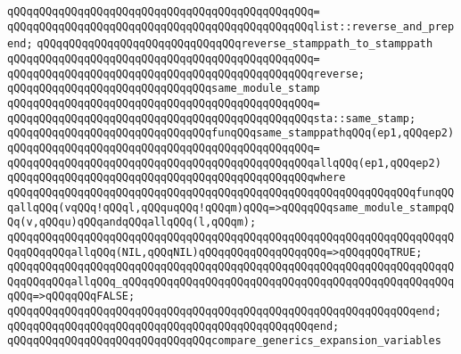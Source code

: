 \verb|qQQqqQQqqQQqqQQqqQQqqQQqqQQqqQQqqQQqqQQqqQQqqQQq=|\newline
\verb|qQQqqQQqqQQqqQQqqQQqqQQqqQQqqQQqqQQqqQQqqQQqqQQqlist::reverse_and_prepend;|\newline
\newline
\newline
\verb|qQQqqQQqqQQqqQQqqQQqqQQqqQQqqQQqreverse_stamppath_to_stamppath|\newline
\verb|qQQqqQQqqQQqqQQqqQQqqQQqqQQqqQQqqQQqqQQqqQQqqQQq=|\newline
\verb|qQQqqQQqqQQqqQQqqQQqqQQqqQQqqQQqqQQqqQQqqQQqqQQqreverse;|\newline
\newline
\newline
\verb|qQQqqQQqqQQqqQQqqQQqqQQqqQQqqQQqsame_module_stamp|\newline
\verb|qQQqqQQqqQQqqQQqqQQqqQQqqQQqqQQqqQQqqQQqqQQqqQQq=|\newline
\verb|qQQqqQQqqQQqqQQqqQQqqQQqqQQqqQQqqQQqqQQqqQQqqQQqsta::same_stamp;|\newline
\newline
\newline
\verb|qQQqqQQqqQQqqQQqqQQqqQQqqQQqqQQqfunqQQqsame_stamppathqQQq(ep1,qQQqep2)|\newline
\verb|qQQqqQQqqQQqqQQqqQQqqQQqqQQqqQQqqQQqqQQqqQQqqQQq=|\newline
\verb|qQQqqQQqqQQqqQQqqQQqqQQqqQQqqQQqqQQqqQQqqQQqqQQqallqQQq(ep1,qQQqep2)|\newline
\verb|qQQqqQQqqQQqqQQqqQQqqQQqqQQqqQQqqQQqqQQqqQQqqQQqwhere|\newline
\verb|qQQqqQQqqQQqqQQqqQQqqQQqqQQqqQQqqQQqqQQqqQQqqQQqqQQqqQQqqQQqqQQqfunqQQqallqQQq(vqQQq!qQQql,qQQquqQQq!qQQqm)qQQq=>qQQqqQQqsame_module_stampqQQq(v,qQQqu)qQQqandqQQqallqQQq(l,qQQqm);|\newline
\verb|qQQqqQQqqQQqqQQqqQQqqQQqqQQqqQQqqQQqqQQqqQQqqQQqqQQqqQQqqQQqqQQqqQQqqQQqqQQqqQQqallqQQq(NIL,qQQqNIL)qQQqqQQqqQQqqQQqqQQq=>qQQqqQQqTRUE;|\newline
\verb|qQQqqQQqqQQqqQQqqQQqqQQqqQQqqQQqqQQqqQQqqQQqqQQqqQQqqQQqqQQqqQQqqQQqqQQqqQQqqQQqallqQQq_qQQqqQQqqQQqqQQqqQQqqQQqqQQqqQQqqQQqqQQqqQQqqQQqqQQqqQQq=>qQQqqQQqFALSE;|\newline
\verb|qQQqqQQqqQQqqQQqqQQqqQQqqQQqqQQqqQQqqQQqqQQqqQQqqQQqqQQqqQQqqQQqend;|\newline
\verb|qQQqqQQqqQQqqQQqqQQqqQQqqQQqqQQqqQQqqQQqqQQqqQQqend;|\newline
\newline
\verb|qQQqqQQqqQQqqQQqqQQqqQQqqQQqqQQqcompare_generics_expansion_variables|\newline
